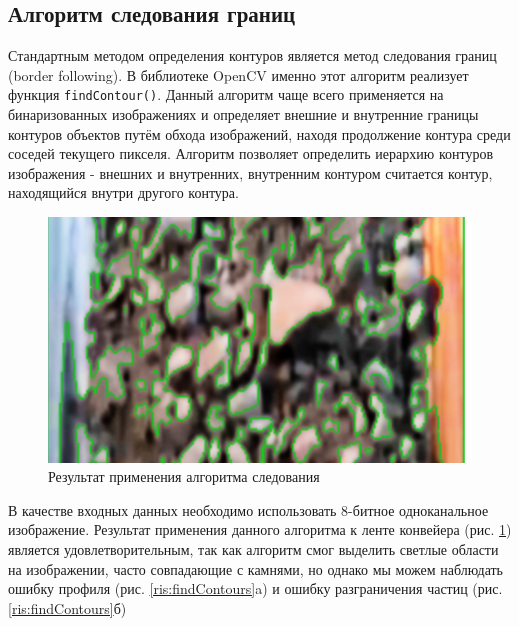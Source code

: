\documentclass[times]{itmo-student-thesis}
\begin{document}
\subsection{Алгоритм следования границ}
Стандартным методом определения контуров является метод следования границ (border following). В библиотеке OpenCV именно этот алгоритм реализует функция \texttt{findContour()}. Данный алгоритм чаще всего применяется на бинаризованных изображениях и определяет внешние и внутренние границы контуров объектов путём обхода изображений, находя продолжение контура среди соседей текущего пикселя. Алгоритм позволяет определить иерархию контуров изображения - внешних и внутренних, внутренним контуром считается контур, находящийся внутри другого контура. 

\begin{figure}[h]
	\centering
	\includegraphics[width=0.6\linewidth]{images/findContour}
	\caption{Результат применения алгоритма следования }
	\label{fig:findcontour}
\end{figure}


В качестве входных данных необходимо использовать 8-битное одноканальное изображение.
Результат применения данного алгоритма к ленте конвейера (рис. \ref{fig:findcontour}) является удовлетворительным, так как алгоритм смог выделить светлые области на изображении, часто совпадающие с камнями, но однако мы можем наблюдать ошибку профиля (рис. \ref{ris:findContours}a) и ошибку разграничения частиц (рис. \ref{ris:findContours}б)
\end{document}
